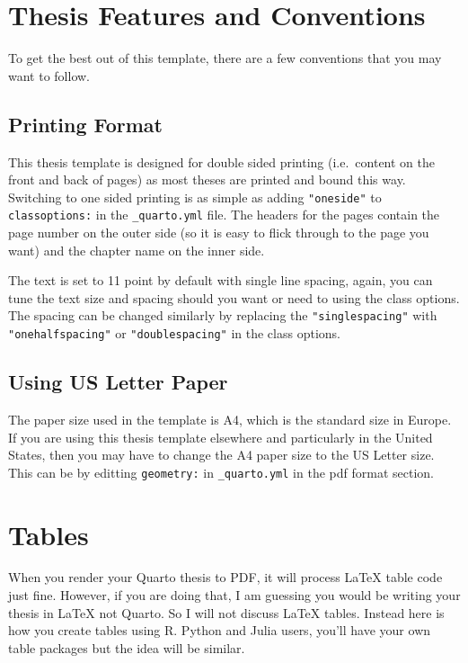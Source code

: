 \documentclass[
  letterpaper,
  11pt,
  english,
  singlespacing,
  headsepline]{MastersDoctoralThesis}
\begin{document}
\section{Thesis Features and Conventions}\label{sec-ThesisConventions}

To get the best out of this template, there are a few conventions that
you may want to follow.

\subsection{Printing Format}\label{printing-format}

This thesis template is designed for double sided printing (i.e.~content
on the front and back of pages) as most theses are printed and bound
this way. Switching to one sided printing is as simple as adding
\texttt{"oneside"} to \texttt{classoptions:} in the
\texttt{\_quarto.yml} file. The headers for the pages contain the page
number on the outer side (so it is easy to flick through to the page you
want) and the chapter name on the inner side.

The text is set to 11 point by default with single line spacing, again,
you can tune the text size and spacing should you want or need to using
the class options. The spacing can be changed similarly by replacing the
\texttt{"singlespacing"} with \texttt{"onehalfspacing"} or
\texttt{"doublespacing"} in the class options.

\subsection{Using US Letter Paper}\label{using-us-letter-paper}

The paper size used in the template is A4, which is the standard size in
Europe. If you are using this thesis template elsewhere and particularly
in the United States, then you may have to change the A4 paper size to
the US Letter size. This can be by editting \texttt{geometry:} in
\texttt{\_quarto.yml} in the pdf format section.

\section{Tables}\label{tables}

When you render your Quarto thesis to PDF, it will process \LaTeX{}
table code just fine. However, if you are doing that, I am guessing you
would be writing your thesis in \LaTeX{} not Quarto. So I will not
discuss \LaTeX{} tables. Instead here is how you create tables using R.
Python and Julia users, you'll have your own table packages but the idea
will be similar.
\end{document}
